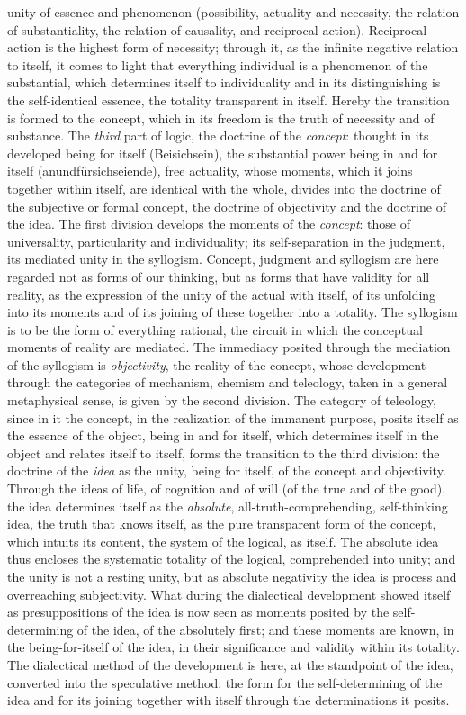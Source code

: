 unity of essence and phenomenon (possibility, actuality and necessity,
the relation of substantiality, the relation of causality, and
reciprocal action). Reciprocal action is the highest form of necessity;
through it, as the infinite negative relation to itself, it comes to
light that everything individual is a phenomenon of the substantial,
which determines itself to individuality and in its distinguishing is
the self-identical essence, the totality transparent in itself. Hereby
the transition is formed to the concept, which in its freedom is the
truth of necessity and of substance. The \emph{third} part of logic,
the doctrine of the \emph{concept}: thought in its developed being
for itself (Beisichsein), the substantial power being in and for itself
(anundfürsichseiende), free actuality, whose moments, which it joins
together within itself, are identical with the whole, divides into
the doctrine of the subjective or formal concept, the doctrine of
objectivity and the doctrine of the idea. The first division develops
the moments of the \emph{concept}: those of universality, particularity
and individuality; its self-separation in the judgment, its mediated
unity in the syllogism. Concept, judgment and syllogism are here
regarded not as forms of our thinking, but as forms that have validity
for all reality, as the expression of the unity of the actual with
itself, of its unfolding into its moments and of its joining of these
together into a totality. The syllogism is to be the form of everything
rational, the circuit in which the conceptual moments of reality are
mediated. The immediacy posited through the mediation of the syllogism
is \emph{objectivity}, the reality of the concept, whose development
through the categories of mechanism, chemism and teleology, taken in a
general metaphysical sense, is given by the second division. The
category of teleology, since in it the concept, in the
realization of the immanent purpose, posits itself as the essence of the
object, being in and for itself, which determines itself in the object
and relates itself to itself, forms the transition to the third
division: the doctrine of the \emph{idea} as the unity, being for
itself, of the concept and objectivity. Through the ideas of life, of
cognition and of will (of the true and of the good), the idea
determines itself as the \emph{absolute}, all-truth-comprehending,
self-thinking idea, the truth that knows itself, as the pure transparent
form of the concept, which intuits its content, the system of the
logical, as itself. The absolute idea thus encloses the systematic
totality of the logical, comprehended into unity; and the unity is not a
resting unity, but as absolute negativity the idea is process and
overreaching subjectivity. What during the dialectical development
showed itself as presuppositions of the idea is now seen as moments
posited by the self-determining of the idea, of the absolutely first;
and these moments are known, in the being-for-itself of the idea, in
their significance and validity within its totality. The dialectical
method of the development is here, at the standpoint of the idea,
converted into the speculative method: the form for the self-determining
of the idea and for its joining together with itself through the
determinations it posits.

